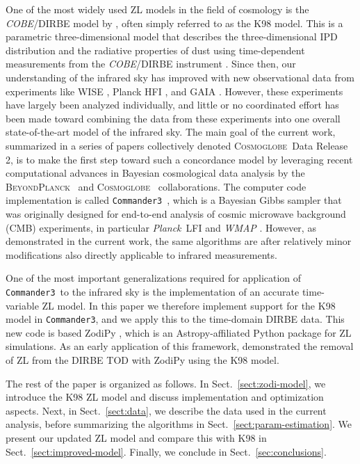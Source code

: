 \documentclass[twocolumn]{aa}
\def\commanderthree{\texttt{Commander3}}
\def\Planck{\textit{Planck}}
\def\WMAP{\textit{WMAP}}
\newcommand{\BP}{\textsc{BeyondPlanck}}
\newcommand{\cosmoglobe}{\textsc{Cosmoglobe}}
\begin{document}
One of the most widely used ZL models in the field of cosmology is the
\textit{COBE}/DIRBE model by \citet{Kelsall1998}, often simply
referred to as the K98 model. This is a parametric three-dimensional
model that describes the three-dimensional IPD distribution and the
radiative properties of dust using time-dependent measurements from
the \textit{COBE}/DIRBE instrument \citep{hauser1998}. Since then, our
understanding of the infrared sky has improved with new observational
data from experiments like WISE \citep{wright:2010}, Planck HFI
\citep{planck2016-l03}, and GAIA \citep{gaia:2016}. However, these
experiments have largely been analyzed individually, and little or no
coordinated effort has been made toward combining the data from these
experiments into one overall state-of-the-art model of the infrared
sky. The main goal of the current work, summarized in a series of
papers collectively denoted \cosmoglobe\ Data Release 2, is to make
the first step toward such a concordance model by leveraging recent
computational advances in Bayesian cosmological data analysis by the
\BP\ \citep[][and references therein]{BP2023,Galloway2023} and
\cosmoglobe\ \citep{Watts2023} collaborations. The computer code
implementation is called \commanderthree\ \citep{Galloway2023}, which
is a Bayesian Gibbs sampler that was originally designed for
end-to-end analysis of cosmic microwave background (CMB) experiments,
in particular \Planck\ LFI \citep{planck2016-l02} and \WMAP
\citep{bennett2012}. However, as demonstrated in the current work, the
same algorithms are after relatively minor modifications also directly
applicable to infrared measurements.

One of the most important generalizations required for application of
\commanderthree\ to the infrared sky is the implementation of an
accurate time-variable ZL model. In this paper we therefore implement
support for the K98 model in \commanderthree, and we apply this to the
time-domain DIRBE data. This new code is based ZodiPy \citep{San2024},
which is an Astropy-affiliated Python package for ZL simulations. As
an early application of this framework, \cite{San2022} demonstrated
the removal of ZL from the DIRBE TOD with ZodiPy using the K98 model.

The rest of the paper is organized as follows. In
Sect.~\ref{sect:zodi-model}, we introduce the K98 ZL model and discuss
implementation and optimization aspects. Next, in
Sect.~\ref{sect:data}, we describe the data used in the current
analysis, before summarizing the algorithms in
Sect.~\ref{sect:param-estimation}. We present our updated ZL model and
compare this with K98 in Sect.~\ref{sect:improved-model}. Finally, we
conclude in Sect.~\ref{sec:conclusions}.
\end{document}
